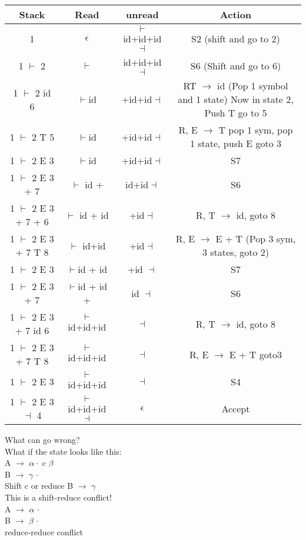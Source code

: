 \documentclass[12pt]{article}
\begin{document}
	\begin{tabular}{c | c | c | c}
		Stack & Read & unread & Action \\ \hline
		1 & $\epsilon$ & $\vdash$id+id+id$\dashv$ & S2 (shift and go to 2) \\
		1 $\vdash$ 2 & $\vdash$ & id+id+id$\dashv$ & S6 (Shift and go to 6) \\
		1 $\vdash$ 2 id 6 & $\vdash$id & +id+id$\dashv$ & RT $\rightarrow$ id (Pop 1 symbol and 1 state) Now in state 2, Push T go to 5\\
		1 $\vdash$ 2 T 5 & $\vdash$id & +id+id$\dashv$ & R, E $\rightarrow$ T pop 1 sym, pop 1 state, push E goto 3\\
		1 $\vdash$ 2 E 3 & $\vdash$id & +id+id$\dashv$ & S7 \\ 
		1 $\vdash$ 2 E 3 + 7 & $\vdash$ id + & id+id$\dashv$ & S6 \\
		1 $\vdash$ 2 E 3 + 7 + 6 & $\vdash$ id + id & +id$\dashv$ & R, T $\rightarrow$ id, goto 8\\
		1 $\vdash$ 2 E 3 + 7 T 8 & $\vdash$ id+id & +id$\dashv$ & R, E $\rightarrow$ E + T (Pop 3 sym, 3 states, goto 2)\\
		1 $\vdash$ 2 E 3 & $\vdash$id + id & +id $\dashv$ & S7 \\
		1 $\vdash$ 2 E 3 + 7 & $\vdash$id + id + & id $\dashv$ & S6 \\
		1 $\vdash$ 2 E 3 + 7 id 6 & $\vdash$id+id+id & $\dashv$ & R, T $\rightarrow$ id, goto 8 \\
		1 $\vdash$ 2 E 3 + 7 T 8 & $\vdash$id+id+id & $\dashv$ & R, E $\rightarrow$ E + T goto3 \\
		1 $\vdash$ 2 E 3 & $\vdash$id+id+id & $\dashv$ & S4\\
		1 $\vdash$ 2 E 3 $\dashv$ 4 & $\vdash$id+id+id$\dashv$ & $\epsilon$ & Accept\\
	\end{tabular}
	
	What can go wrong?\\
	What if the state looks like this:\\
	A $\rightarrow$ $\alpha \cdot$ c $\beta$\\
	B $\rightarrow$ $\gamma$ $\cdot$\\
	Shift c or reduce B $\rightarrow$ $\gamma$\\
	This is a shift-reduce conflict!\\
	
	A $\rightarrow$ $\alpha$ $\cdot$\\
	B $\rightarrow$ $\beta$ $\cdot$ \\
	reduce-reduce conflict\\
	
\end{document}
